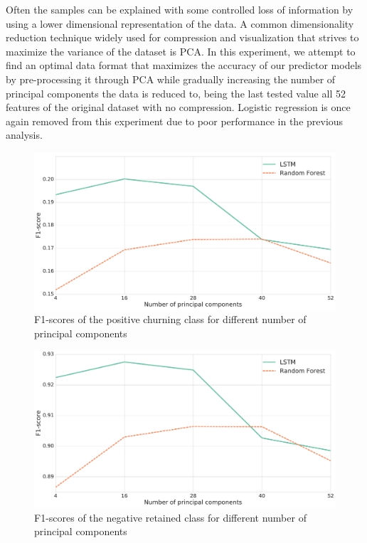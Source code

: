 \documentclass{kththesis}
\begin{document}
Often the samples can be explained with some controlled loss of information by using a lower dimensional representation of the data. A common dimensionality reduction technique widely used for compression and visualization that strives to maximize the variance of the dataset is PCA. In this experiment, we attempt to find an optimal data format that maximizes the accuracy of our predictor models by pre-processing it through PCA while gradually increasing the number of principal components the data is reduced to, being the last tested value all 52 features of the original dataset with no compression. Logistic regression is once again removed from this experiment due to poor performance in the previous analysis.

\begin{figure}
    \centering
    \includegraphics[width=1.0\textwidth,keepaspectratio]{figures/line_dim_reduction.pdf}
    \caption{F1-scores of the positive churning class for different number of principal components}
    \label{fig:line_dim_reduction}
\end{figure}

\begin{figure}
    \centering
    \includegraphics[width=1.0\textwidth,keepaspectratio]{figures/line_dim_reduction_retained.pdf}
    \caption{F1-scores of the negative retained class for different number of principal components}
    \label{fig:line_dim_reduction_ret}
\end{figure}
\end{document}
